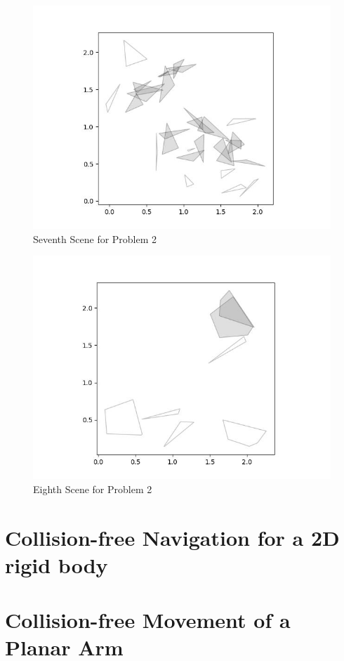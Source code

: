 \documentclass{article}
\begin{document}
\begin{figure}[h!]
	\includegraphics[width= 0.9 \linewidth]{Problem2_scene7.jpg}
	\centering
	\caption{Seventh Scene for Problem 2}
	\label{Problem2_scene7.jpg}
\end{figure}

\begin{figure}[h!]
	\includegraphics[width= 0.9 \linewidth]{Problem2_scene8.jpg}
	\centering
	\caption{Eighth Scene for Problem 2}
	\label{Problem2_scene8.jpg}
\end{figure}


 
\section{Collision-free Navigation for a 2D rigid body}
 
\section{Collision-free Movement of a Planar Arm}
\end{document}
